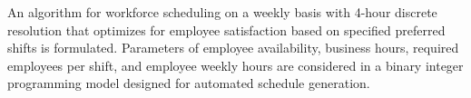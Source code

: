 An algorithm for workforce scheduling on a weekly basis with 4-hour discrete resolution that optimizes for employee satisfaction based on specified preferred shifts is formulated. Parameters of employee availability, business hours, required employees per shift, and employee weekly hours are considered in a binary integer programming model designed for automated schedule generation. 
